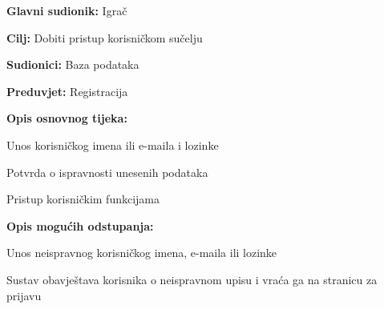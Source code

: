 				
					\noindent {}
					\begin{packed_item}
					
					\item \textbf{Glavni sudionik: }Igrač
					\item  \textbf{Cilj:} Dobiti pristup korisničkom sučelju
					\item  \textbf{Sudionici:} Baza podataka
					\item  \textbf{Preduvjet:} Registracija
					\item  \textbf{Opis osnovnog tijeka:}
					
					\item[] \begin{packed_enum}
						
						\item Unos korisničkog imena ili e-maila i lozinke
						\item Potvrda o ispravnosti unesenih podataka
						\item Pristup korisničkim funkcijama
					\end{packed_enum}
					
					\item  \textbf{Opis mogućih odstupanja:}
					
					\item[] \begin{packed_item}
						
						\item[2.a] Unos neispravnog korisničkog imena, e-maila ili lozinke
						\item[] \begin{packed_enum}
							
							\item Sustav obavještava korisnika o neispravnom upisu i vraća ga na stranicu za prijavu
							
						\end{packed_enum}
						
					\end{packed_item}
					\end{packed_item}
				
